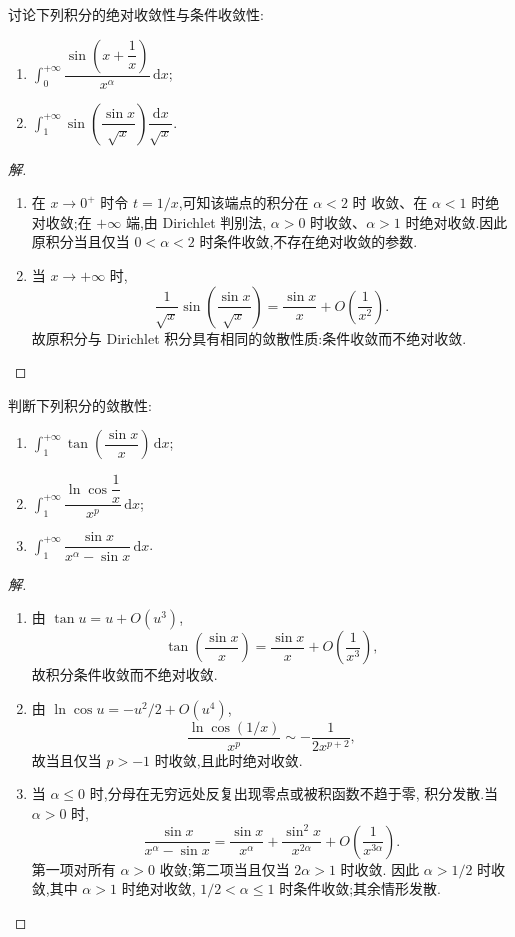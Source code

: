 \documentclass[../../数学分析培优讲义(答案版).tex]{subfiles}
\begin{document}
\begin{example}
讨论下列积分的绝对收敛性与条件收敛性:
\begin{enumerate}[label=(\arabic*)]
    \item $\displaystyle\int_0^{+\infty}\dfrac{\sin\left(x+\dfrac{1}{x}\right)}{x^\alpha}\,\mathrm{d}x$;
    \item $\displaystyle\int_1^{+\infty}\sin\left(\dfrac{\sin x}{\sqrt{x}}\right)\dfrac{\mathrm{d}x}{\sqrt{x}}$.
\end{enumerate}
\end{example}

\begin{proof}[解]
\begin{enumerate}[label=(\arabic*)]
    \item 在 $x\to0^+$ 时令 $t=1/x$,可知该端点的积分在 $\alpha<2$ 时
    收敛、在 $\alpha<1$ 时绝对收敛;在 $+\infty$ 端,由 Dirichlet 判别法,
    $\alpha>0$ 时收敛、$\alpha>1$ 时绝对收敛.因此原积分当且仅当
    $0<\alpha<2$ 时条件收敛,不存在绝对收敛的参数.

    \item 当 $x\to+\infty$ 时,
    \[
        \dfrac{1}{\sqrt{x}}\sin\left(\dfrac{\sin x}{\sqrt{x}}\right)
        =\dfrac{\sin x}{x}+O\left(\dfrac{1}{x^2}\right).
    \]
    故原积分与 Dirichlet 积分具有相同的敛散性质:条件收敛而不绝对收敛.
\end{enumerate}
\end{proof}

\begin{example}
判断下列积分的敛散性:
\begin{enumerate}[label=(\arabic*)]
    \item $\displaystyle\int_1^{+\infty}\tan\left(\dfrac{\sin x}{x}\right)\,\mathrm{d}x$;
    \item $\displaystyle\int_1^{+\infty}\dfrac{\ln\cos\dfrac{1}{x}}{x^p}\,\mathrm{d}x$;
    \item $\displaystyle\int_1^{+\infty}\dfrac{\sin x}{x^\alpha-\sin x}\,\mathrm{d}x$.
\end{enumerate}
\end{example}

\begin{proof}[解]
\begin{enumerate}[label=(\arabic*)]
    \item 由 $\tan u=u+O(u^3)$,
    \[
        \tan\left(\dfrac{\sin x}{x}\right)
        =\dfrac{\sin x}{x}+O\left(\dfrac{1}{x^3}\right),
    \]
    故积分条件收敛而不绝对收敛.
    \item 由 $\ln\cos u=-u^2/2+O(u^4)$,
    \[
        \dfrac{\ln\cos(1/x)}{x^p}\sim-\dfrac{1}{2x^{p+2}},
    \]
    故当且仅当 $p>-1$ 时收敛,且此时绝对收敛.
    \item 当 $\alpha\leq0$ 时,分母在无穷远处反复出现零点或被积函数不趋于零,
    积分发散.当 $\alpha>0$ 时,
    \[
        \dfrac{\sin x}{x^\alpha-\sin x}
        =\dfrac{\sin x}{x^\alpha}+\dfrac{\sin^2x}{x^{2\alpha}}
        +O\left(\dfrac{1}{x^{3\alpha}}\right).
    \]
    第一项对所有 $\alpha>0$ 收敛;第二项当且仅当 $2\alpha>1$ 时收敛.
    因此 $\alpha>1/2$ 时收敛,其中 $\alpha>1$ 时绝对收敛,
    $1/2<\alpha\leq1$ 时条件收敛;其余情形发散.
\end{enumerate}
\end{proof}
\end{document}
